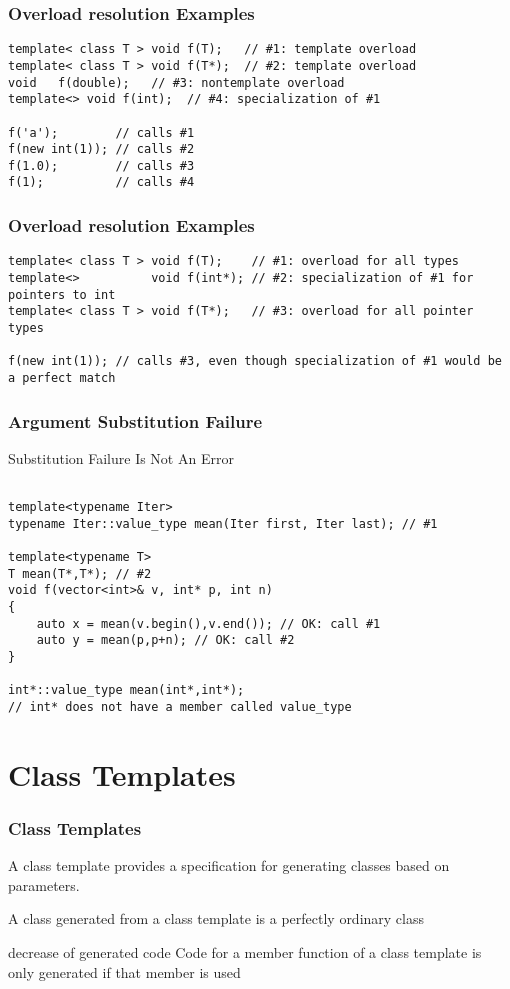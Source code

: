 \documentclass{beamer}
\begin{document}
\begin{frame}[fragile]
\frametitle{Overload resolution Examples}

\begin{lstlisting}
template< class T > void f(T);   // #1: template overload
template< class T > void f(T*);  // #2: template overload
void   f(double);   // #3: nontemplate overload
template<> void f(int);  // #4: specialization of #1
 
f('a');        // calls #1
f(new int(1)); // calls #2
f(1.0);        // calls #3
f(1);          // calls #4
\end{lstlisting}

\end{frame}

\begin{frame}[fragile]
\frametitle{Overload resolution Examples}

\begin{lstlisting}
template< class T > void f(T);    // #1: overload for all types
template<>          void f(int*); // #2: specialization of #1 for pointers to int
template< class T > void f(T*);   // #3: overload for all pointer types
 
f(new int(1)); // calls #3, even though specialization of #1 would be a perfect match
\end{lstlisting}
\end{frame}

\begin{frame}[fragile]
\frametitle{Argument Substitution Failure}

Substitution Failure Is Not An Error
\begin{lstlisting}

template<typename Iter>
typename Iter::value_type mean(Iter first, Iter last); // #1

template<typename T>
T mean(T*,T*); // #2
void f(vector<int>& v, int* p, int n)
{
    auto x = mean(v.begin(),v.end()); // OK: call #1
    auto y = mean(p,p+n); // OK: call #2
}

int*::value_type mean(int*,int*); 
// int* does not have a member called value_type
\end{lstlisting}
\end{frame}

\section{Class Templates}

\begin{frame}
\frametitle{Class Templates}

A class template provides a specification for generating classes based on parameters.

A class generated from a class template is a perfectly ordinary class

\begin{block}{decrease of generated code}
Code for a member function of a class template is only generated if that member is used
\end{block}

\end{frame}
\end{document}
